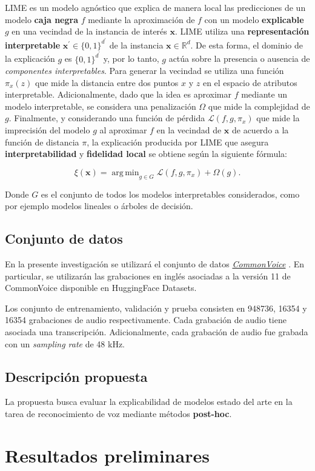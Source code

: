 \documentclass[conference]{IEEEtran}
\DeclareMathOperator*{\argmin}{arg\,min}
\begin{document}
LIME \cite{ribeiro2016why} es un modelo agnóstico que explica de manera local las predicciones de un modelo \textbf{caja negra} $f$ mediante la aproximación de $f$ con un modelo \textbf{explicable} $g$ en una vecindad de la instancia de interés $\bm{x}$. LIME utiliza una \textbf{representación interpretable} $\bm{x^\prime} \in \{0,1\}^{d^\prime}$ de la instancia $\bm{x} \in \mathbb{R}^d$. De esta forma, el dominio de la explicación $g$ es $\{0,1\}^{d^\prime}$ y, por lo tanto, $g$ actúa sobre la presencia o ausencia de \textit{componentes interpretables}. Para generar la vecindad se utiliza una función $\pi_x(z)$ que mide la distancia entre dos puntos $x$ y $z$ en el espacio de atributos interpretable. Adicionalmente, dado que la idea es aproximar $f$ mediante un modelo interpretable, se considera una penalización $\Omega$ que mide la complejidad de $g$. Finalmente, y considerando una función de pérdida $\mathcal{L}(f, g, \pi_x)$ que mide la imprecisión del modelo $g$ al aproximar $f$ en la vecindad de $\bm{x}$ de acuerdo a la función de distancia $\pi$, la explicación producida por LIME que asegura \textbf{interpretabilidad} y \textbf{fidelidad local} se obtiene según la siguiente fórmula:

\begin{equation}
    \xi(\bm{x}) = \argmin_{g \in G} \mathcal{L}(f, g, \pi_x) + \Omega(g).
\end{equation}

Donde $G$ es el conjunto de todos los modelos interpretables considerados, como por ejemplo modelos lineales o árboles de decisión.

\subsection{Conjunto de datos}

En la presente investigación se utilizará el conjunto de datos \href{https://commonvoice.mozilla.org/en/datasets}{\textit{CommonVoice}} \cite{commonvoice:2020}. En particular, se utilizarán las grabaciones en inglés asociadas a la versión 11 de CommonVoice disponible en HuggingFace Datasets.

Los conjunto de entrenamiento, validación y prueba consisten en 948736, 16354 y 16354 grabaciones de audio respectivamente. Cada grabación de audio tiene asociada una transcripción. Adicionalmente, cada grabación de audio fue grabada con un \textit{sampling rate} de 48 kHz.

\subsection{Descripción propuesta}

La propuesta busca evaluar la explicabilidad de modelos estado del arte en la tarea de reconocimiento de voz mediante métodos \textbf{post-hoc}.

\section{Resultados preliminares}

\printbibliography
\end{document}
